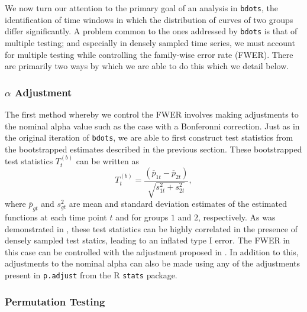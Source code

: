 \documentclass{article}
\newcommand{\xt}{\texttt}%
\begin{document}
We now turn our attention to the primary goal of an analysis in \xt{bdots}, the identification of time windows in which the distribution of curves of two groups differ significantly. A problem common to the ones addressed by \xt{bdots} is that of multiple testing; and especially in densely sampled time series, we must account for multiple testing while controlling the family-wise error rate (FWER). There are primarily two ways by which we are able to do this which we detail below.

\subsubsection{$\alpha$ Adjustment}

The first method whereby we control the FWER involves making adjustments to the nominal alpha value such as the case with a Bonferonni correction. Just as in the original iteration of \xt{bdots}, we are able to first construct test statistics from the bootstrapped estimates described in the previous section. These bootstrapped test statistics $T_t^{(b)}$ can be written as 
\begin{equation}\label{eq:test_statistic}
T_t^{(b)} = \frac{(\overline{p}_{1t} - \overline{p}_{2t})}{\sqrt{s_{1t}^2 + s_{2t}^2}},
\end{equation}
where $\overline{p}_{gt}$ and $s_{gt}^2$ are mean and standard deviation estimates  of the estimated functions at each time point $t$ and for groups $1$ and $2$, respectively. As was demonstrated in \cite{oleson2017detecting}, these test statistics can be highly correlated in the presence of densely sampled test statics, leading to an inflated type I error. The FWER in this case can be controlled with the adjustment proposed in \citet{oleson2017detecting}. In addition to this, adjustments to the nominal alpha can also be made using any of the adjustments present in \xt{p.adjust} from the R \xt{stats} package.


\subsubsection{Permutation Testing}
\end{document}
